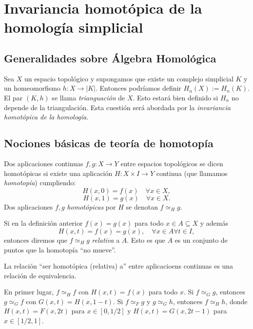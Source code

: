 \documentclass[HS.tex]{subfiles}
\begin{document}
\chapter{Invariancia homotópica de la homología simplicial}

\section{Generalidades sobre Álgebra Homológica}
Sea $X$ un espacio topológico y supongamos que existe un complejo simplicial $K$ y un homeomorfismo $h \colon X \to |K|$.
Entonces podríamos definir $H_n(X) := H_n(K)$.
El par $(K,h)$ se llama \emph{trianguación} de $X$.
Esto estará bien definido si $H_n$ no depende de la triangulación.
Esta cuestión será abordada por la \emph{invariancia homotópica de la homología}.

\section{Nociones básicas de teoría de homotopía}
\begin{defi}\label{homotopia}
Dos aplicaciones continuas $f,g \colon X \to Y$ entre espacios topológicos se dicen homotópicas si existe una aplicación $H \colon X \times I \to Y$ continua (que llamamos \emph{homotopía}) cumpliendo:
\[ H(x,0) = f(x) \quad \forall x \in X, \]
\[ H(x,1) = g(x) \quad \forall x \in X. \]
Dos aplicaciones $f,g$ \emph{homotópicas} por $H$ se denotan $f \simeq_H g$. 
\end{defi}

\begin{defi}
Si en la definición anterior $f(x) = g(x)$ para todo $x \in A \subseteq X$ y además
\[ H(x,t) = f(x) = g(x),\quad \forall x \in A \forall t \in I, \]
entonces diremos que $f \simeq_H g$ \emph{relativa} a $A$.
Esto es que $A$ es un conjunto de puntos que la homotopía ``no mueve''.
\end{defi}

\begin{prop}
La relación ``ser homotópica (relativa) a'' entre aplicacioens continuas es una relación de equivalencia.
\end{prop}
\begin{dem}
En primer lugar, $f\simeq_H f$ con $H(x,t)=f(x)$ para todo $x$. Si $f\simeq_G g$, entonces $g\simeq_G f$ con $G(x,t)=H(x,1-t)$. Si $f\simeq_F g$ y $g\simeq_G h$, entonces $f\simeq_H h$, donde $H(x,t)=F(x,2t)$ para  $x\in [0,1/2]$ y $H(x,t)=G(x,2t-1)$ para $x\in [1/2,1]$.\QED
\end{dem}
\end{document}
